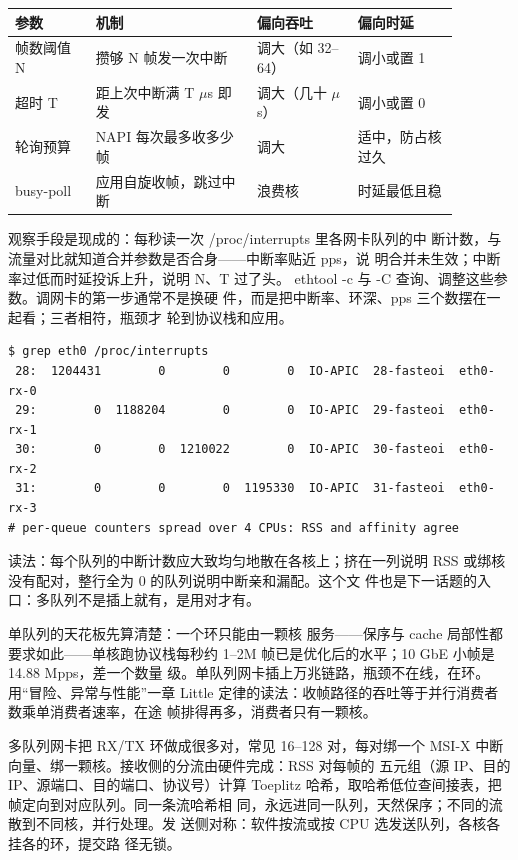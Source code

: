 \begin{longtable}{L{0.16\linewidth}L{0.32\linewidth}L{0.20\linewidth}L{0.20\linewidth}}
\toprule
参数 & 机制 & 偏向吞吐 & 偏向时延 \\
\midrule
帧数阈值 N & 攒够 N 帧发一次中断 & 调大（如 32--64） & 调小或置 1 \\\tablerowrule
超时 T & 距上次中断满 T $\mu$s 即发 & 调大（几十 $\mu$s） & 调小或置 0 \\\tablerowrule
轮询预算 & NAPI 每次最多收多少帧 & 调大 & 适中，防占核过久 \\\tablerowrule
busy-poll & 应用自旋收帧，跳过中断 & 浪费核 & 时延最低且稳 \\
\bottomrule
\end{longtable}

观察手段是现成的：每秒读一次 /proc/interrupts 里各网卡队列的中
断计数，与流量对比就知道合并参数是否合身——中断率贴近 pps，说
明合并未生效；中断率过低而时延投诉上升，说明 N、T 过了头。
ethtool -c 与 -C 查询、调整这些参数。调网卡的第一步通常不是换硬
件，而是把中断率、环深、pps 三个数摆在一起看；三者相符，瓶颈才
轮到协议栈和应用。

\begin{lstlisting}
$ grep eth0 /proc/interrupts
 28:  1204431        0        0        0  IO-APIC  28-fasteoi  eth0-rx-0
 29:        0  1188204        0        0  IO-APIC  29-fasteoi  eth0-rx-1
 30:        0        0  1210022        0  IO-APIC  30-fasteoi  eth0-rx-2
 31:        0        0        0  1195330  IO-APIC  31-fasteoi  eth0-rx-3
# per-queue counters spread over 4 CPUs: RSS and affinity agree
\end{lstlisting}

读法：每个队列的中断计数应大致均匀地散在各核上；挤在一列说明
RSS 或绑核没有配对，整行全为 0 的队列说明中断亲和漏配。这个文
件也是下一话题的入口：多队列不是插上就有，是用对才有。

单队列的天花板先算清楚：一个环只能由一颗核
服务——保序与 cache 局部性都要求如此——单核跑协议栈每秒约
1--2M 帧已是优化后的水平；10 GbE 小帧是 14.88 Mpps，差一个数量
级。单队列网卡插上万兆链路，瓶颈不在线，在环。用“冒险、异常与性能”一章 Little
定律的读法：收帧路径的吞吐等于并行消费者数乘单消费者速率，在途
帧排得再多，消费者只有一颗核。

多队列网卡把 RX/TX 环做成很多对，常见 16--128 对，每对绑一个
MSI-X 中断向量、绑一颗核。接收侧的分流由硬件完成：RSS 对每帧的
五元组（源 IP、目的 IP、源端口、目的端口、协议号）计算 Toeplitz
哈希，取哈希低位查间接表，把帧定向到对应队列。同一条流哈希相
同，永远进同一队列，天然保序；不同的流散到不同核，并行处理。发
送侧对称：软件按流或按 CPU 选发送队列，各核各挂各的环，提交路
径无锁。

